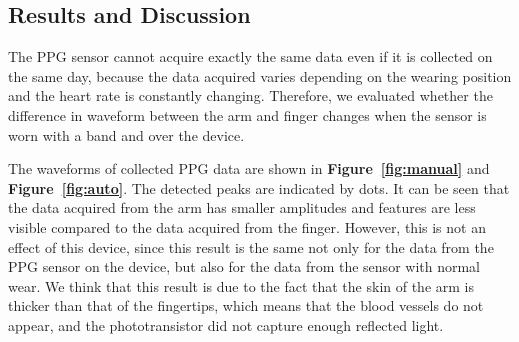 \documentclass[sigconf]{acmart}
\newcommand\figref[1]{\textbf{Figure~\ref{fig:#1}}}
\begin{document}
\subsection{Results and Discussion}
The PPG sensor cannot acquire exactly the same data even if it is collected on the same day, because the data acquired varies depending on the wearing position and the heart rate is constantly changing. Therefore, we evaluated whether the difference in waveform between the arm and finger changes when the sensor is worn with a band and over the device.\par

The waveforms of collected PPG data are shown in \figref{manual} and \figref{auto}. The detected peaks are indicated by dots. It can be seen that the data acquired from the arm has smaller amplitudes and features are less visible compared to the data acquired from the finger. However, this is not an effect of this device, since this result is the same not only for the data from the PPG sensor on the device, but also for the data from the sensor with normal wear. We think that this result is due to the fact that the skin of the arm is thicker than that of the fingertips, which means that the blood vessels do not appear, and the phototransistor did not capture enough reflected light.\par
\end{document}
